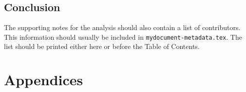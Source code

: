 \documentclass[NOTE, REPORT=true, atlasdraft=true, british, subfigure]{atlasdoc}
\begin{document}


\chapter{Conclusion}
\label{sec:conclusion}



\printbibliography
% 
% 

\clearpage
The supporting notes for the analysis should also contain a list of contributors.
This information should usually be included in \texttt{mydocument-metadata.tex}.
The list should be printed either here or before the Table of Contents.

\clearpage
\appendix
\part*{Appendices}


\end{document}
